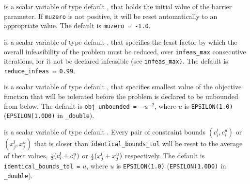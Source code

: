 \begin{description}
  is a scalar variable of type default \realdp, that holds the
initial value of the barrier parameter. If {\tt muzero} is
not positive, it will be reset automatically to an appropriate value.
The default is {\tt muzero = -1.0}.

  is a scalar variable of type default 
\realdp, that specifies the
least factor by which the overall infeasibility of the problem must be reduced,
over {\tt infeas\_max} consecutive iterations, 
for it not be declared infeasible (see {\tt infeas\_max)}.
The default is {\tt reduce\_infeas = 0.99}.

  is a scalar variable of type default 
\realdp, that specifies smallest
value of the objective function that will be tolerated before the problem
is declared to be unbounded from below.
The default is {\tt obj\_u\-nbounded =} $-u^{-2}$,
where $u$ is {\tt EPSILON(1.0)} ({\tt EPSILON(1.0D0)} in 
{\tt \fullpackagename\_double}).




is a scalar variable of type default \realdp.
Every pair of constraint bounds 
$(c_{i}^{l}, c_{i}^{u})$ or $(x_{j}^{l}, x_{j}^{u})$
that is closer than {\tt identical\_bounds\_tol} 
will be reset to the average of their values,
${\scriptstyle \frac{1}{2}} (c_{i}^{l} + c_{i}^{u})$ or ${\scriptstyle \frac{1}{2}} (x_{j}^{l} + x_{j}^{u})$
respectively.
The default is {\tt identical\_bounds\_tol =} $u$,
where $u$ is {\tt EPSILON(1.0)} ({\tt EPSILON(1.0D0)} in 
{\tt \fullpackagename\_double}).


\end{description}
